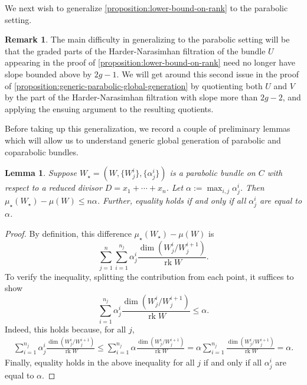 \documentclass[12 pt]{amsart}
\theoremstyle{plain}
\newtheorem{lemma}[subsubsection]{Lemma}
\theoremstyle{definition}
\newtheorem{remark}[subsubsection]{Remark}
\theoremstyle{remark}
\numberwithin{equation}{section}
\DeclareMathOperator\rk{rk}
\begin{document}
We next wish to generalize \autoref{proposition:lower-bound-on-rank} to the parabolic setting.
\begin{remark}
	\label{remark:}
	The main difficulty in generalizing to the parabolic setting will be that
the graded parts of the Harder-Narasimhan filtration of the bundle
$U$ appearing in the proof of \autoref{proposition:lower-bound-on-rank} need no
longer have slope bounded above by $2g-1$.
We will get around this second issue in the proof of
\autoref{proposition:generic-parabolic-global-generation}
by quotienting both $U$ and $V$ by the
part of the Harder-Narasimhan filtration with slope more than $2g-2$, and
applying the ensuing argument to the resulting quotients.
\end{remark}

Before taking up this generalization, we record a couple of preliminary lemmas which will allow us to
understand generic global generation of
parabolic and coparabolic bundles.

\begin{lemma}
	\label{lemma:pushforward-degree}
Suppose $W_\star= (W,\{ W^i_j\}, \{\alpha^i_j\})$ is a parabolic bundle on $C$ with respect to a reduced divisor $D=x_1+\cdots+x_n$.
	Let $\alpha := \max_{i,j} \alpha^i_j$.	
	Then 
	$\mu_\star(W_\star) - \mu(W) \leq n\alpha$.
	Further, equality holds if and only if all $\alpha^i_j$ are equal to
	$\alpha$.
\end{lemma}
\begin{proof}
	By definition, this difference $\mu_\star(W_\star) - \mu(W)$ is
	$$\sum_{j=1}^n \sum_{i=1}^{n_j} \alpha^i_j \frac{\dim
	(W^i_j/W_j^{i+1})}{\rk W}.$$
	To verify the inequality, splitting the contribution from each point, 
	it suffices to show 
	$$\sum_{i=1}^{n_j} \alpha^i_j \frac{\dim
	(W^i_j/W_j^{i+1})}{\rk W} \leq \alpha.$$
	Indeed, this holds because, for all $j$,
	\begin{align*}
		\sum_{i=1}^{n_j} \alpha^i_j \frac{\dim
	(W^i_j/W_j^{i+1})}{\rk W} \leq \sum_{i=1}^{n_j} \alpha \frac{\dim
	(W^i_j/W_j^{i+1})}{\rk W} = \alpha \sum_{i=1}^{n_j}  \frac{\dim
	(W^i_j/W_j^{i+1})}{\rk W} = \alpha.
	\end{align*}
	Finally, equality holds in the above inequality for all $j$ if and only if all
	$\alpha^i_j$ are equal to $\alpha$.
\end{proof}
\end{document}
